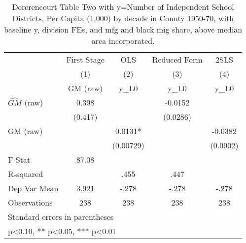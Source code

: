 \begin{table}[htbp]\centering
\def\sym#1{\ifmmode^{#1}\else\(^{#1}\)\fi}
\caption{Dererencourt Table Two with y=Number of Independent School Districts, Per Capita (1,000) by decade in County 1950-70, with baseline y, division FEs, and mfg and black mig share, above median area incorporated.}
\begin{tabular}{l*{4}{c}}
\toprule
                    & First Stage   &         OLS   &Reduced Form   &        2SLS   \\
                    &\multicolumn{1}{c}{(1)}&\multicolumn{1}{c}{(2)}&\multicolumn{1}{c}{(3)}&\multicolumn{1}{c}{(4)}\\
                    &\multicolumn{1}{c}{GM  (raw)}&\multicolumn{1}{c}{y\_L0}&\multicolumn{1}{c}{y\_L0}&\multicolumn{1}{c}{y\_L0}\\
\midrule
$\hat{GM}$ (raw)    &       0.398   &               &     -0.0152   &               \\
                    &     (0.417)   &               &    (0.0286)   &               \\
\addlinespace
GM  (raw)           &               &      0.0131*  &               &     -0.0382   \\
                    &               &   (0.00729)   &               &    (0.0902)   \\
\midrule
F-Stat              &       87.08   &               &               &               \\
R-squared           &               &        .455   &        .447   &               \\
Dep Var Mean        &       3.921   &       -.278   &       -.278   &       -.278   \\
Observations        &         238   &         238   &         238   &         238   \\
\bottomrule
\multicolumn{5}{l}{\footnotesize Standard errors in parentheses}\\
\multicolumn{5}{l}{\footnotesize * p<0.10, ** p<0.05, *** p<0.01}\\
\end{tabular}
\end{table}
